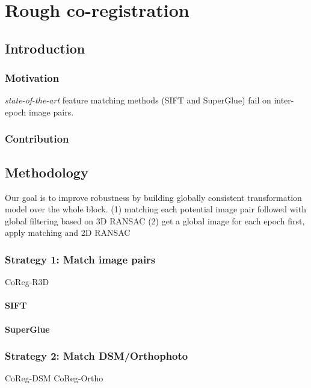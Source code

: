 
\chapter{Rough co-registration}
\label{chap:intro}
\minitoc

\section{Introduction}
\subsection{Motivation}
\textit{state-of-the-art} feature matching methods (SIFT and SuperGlue) fail on inter-epoch image pairs.
\subsection{Contribution}

\section{Methodology}
Our goal is to improve robustness by building globally consistent transformation model over the whole block.
(1) matching each potential image pair followed with global filtering based on 3D RANSAC
(2) get a global image for each epoch first, apply matching and 2D RANSAC

\subsection{Strategy 1: Match image pairs}
CoReg-R3D
\subsubsection{SIFT}
\subsubsection{SuperGlue}
\subsection{Strategy 2: Match DSM/Orthophoto}
CoReg-DSM
CoReg-Ortho

